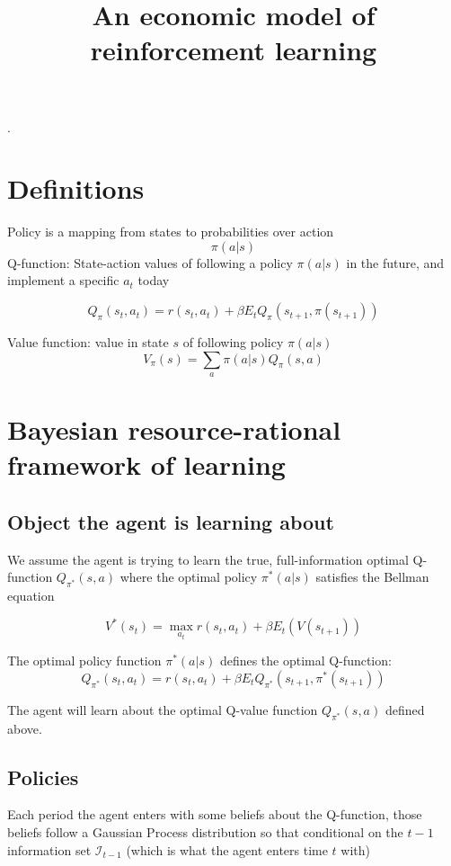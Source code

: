 \documentclass[12pt]{article}%
\begin{document}
\title{An economic model of reinforcement learning}
\maketitle

.\bigskip

\section{Definitions}

Policy is a mapping from states to probabilities over action
\[
\pi(a|s)
\]
Q-function: State-action values of following a policy $\pi(a|s)$ in the
future, and implement a specific $a_{t}$ today%

\[
Q_{\pi}(s_{t},a_{t})=r(s_{t},a_{t})+\beta E_{t}Q_{\pi}(s_{t+1},\pi(s_{t+1}))
\]


Value function: value in state $s$ of following policy $\pi(a|s)$
\begin{equation}
V_{\pi}(s)=\sum_{a}\pi(a|s)Q_{\pi}(s,a) \label{v_pi_s}%
\end{equation}


\section{Bayesian resource-rational framework of learning}

\subsection{Object the agent is learning about}

We assume the agent is trying to learn the true, full-information optimal
Q-function $Q_{\pi^{*}}(s,a)$ where the optimal policy $\pi^{*}(a|s)$
satisfies the Bellman equation%

\[
V^{*}(s_{t}) = \max_{a_{t}} r(s_{t},a_{t}) + \beta E_{t}( V(s_{t+1}))
\]


The optimal policy function $\pi^{*}(a|s)$ defines the optimal Q-function:
\[
Q_{\pi^{*}}(s_{t},a_{t})=r(s_{t},a_{t})+\beta E_{t}Q_{\pi^{*}} (s_{t+1}%
,\pi^{*}(s_{t+1}))
\]


The agent will learn about the optimal Q-value function $Q_{\pi^{*}}(s,a)$
defined above.

\subsection{Policies}

Each period the agent enters with some beliefs about the Q-function, those
beliefs follow a Gaussian Process distribution so that conditional on the
$t-1$ information set $\mathcal{I}_{t-1}$ (which is what the agent enters time
$t$ with)%
\end{document}
